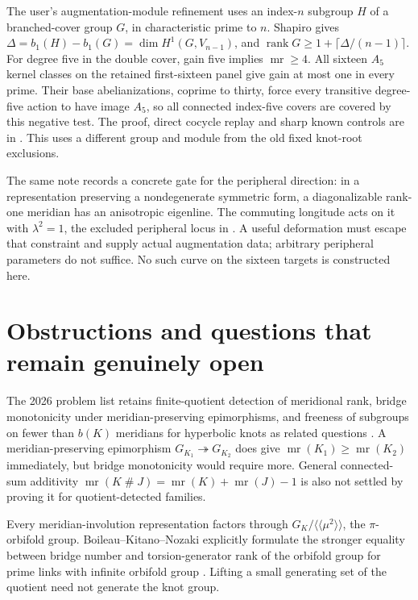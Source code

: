 \documentclass[11pt]{article}
\newcommand{\mr}{\operatorname{mr}}
\begin{document}
The user's augmentation-module refinement uses an index-$n$ subgroup
$H$ of a branched-cover group $G$, in characteristic prime to $n$.
Shapiro gives $\Delta=b_1(H)-b_1(G)=\dim H^1(G,V_{n-1})$, and
$\operatorname{rank}G\ge1+\lceil\Delta/(n-1)\rceil$. For degree five in the
double cover, gain five implies $\mr\ge4$. All sixteen $A_5$
kernel classes on the retained first-sixteen panel give gain at most
one in every prime. Their base abelianizations, coprime to thirty,
force every transitive degree-five action to have image $A_5$,
so all connected index-five covers are covered by this negative
test. The proof, direct cocycle replay and sharp known controls are
in . This uses a different
group and module from the old fixed knot-root exclusions.

The same note records a concrete gate for the peripheral direction:
in a representation preserving a nondegenerate symmetric form, a
diagonalizable rank-one meridian has an anisotropic eigenline.
The commuting longitude acts on it with $\lambda^2=1$, the excluded
peripheral locus in \cite[Section 2.3]{whitehead}. A useful deformation
must escape that constraint and supply actual augmentation data;
arbitrary peripheral parameters do not suffice. No such curve on
the sixteen targets is constructed here.

\section{Obstructions and questions that remain genuinely open}

The 2026 problem list retains finite-quotient detection of meridional
rank, bridge monotonicity under meridian-preserving epimorphisms, and
freeness of subgroups on fewer than $b(K)$ meridians for hyperbolic knots
as related questions \cite{k3}. A meridian-preserving epimorphism
$G_{K_1}\twoheadrightarrow G_{K_2}$ does give
$\mr(K_1)\ge\mr(K_2)$ immediately, but bridge monotonicity would require
more. General connected-sum additivity
$\mr(K\mathbin{\#}J)=\mr(K)+\mr(J)-1$ is also not settled by proving it
for quotient-detected families.

Every meridian-involution representation factors through
$G_K/\langle\!\langle\mu^2\rangle\!\rangle$, the $\pi$-orbifold group.
Boileau--Kitano--Nozaki explicitly formulate the stronger equality between
bridge number and torsion-generator rank of the orbifold group for prime
links with infinite orbifold group \cite{preorder}. Lifting a small
generating set of the quotient need not generate the knot group.
\end{document}
